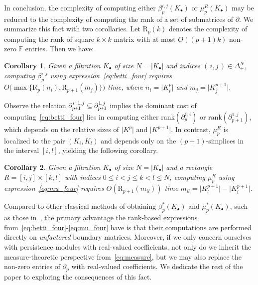 \documentclass[10pt]{article}
\numberwithin{equation}{section}
\newcommand{\+}{%
	\raisebox{0.18ex}{\scaleobj{0.55}{+}}
}
\newtheorem{corollary}{Corollary}
\theoremstyle{definition}
\begin{document}
\noindent In conclusion, the complexity of computing either $\beta_p^{i,j}(K_\bullet)$ or $\mu_p^{R}(K_\bullet)$ may be reduced to the complexity of computing the rank of a set of submatrices of $\partial$. We summarize this fact with two corollaries. Let $\mathrm{R}_p(k)$ denotes the complexity of computing the rank of square $k \times k$ matrix with at most $O((p+1)k)$ non-zero $\mathbb{F}$ entries. Then we have:
\begin{corollary}
	Given a filtration $K_\bullet$ of size $N = \lvert K_\bullet \rvert$ and indices $(\,i,j\,) \in \Delta_+^N$, computing $\beta_p^{i,j}$ using expression~\eqref{eq:betti_four} requires $O\big(\max \{\mathrm{R}_{p}(n_i), \mathrm{R}_{p+1}(m_j) \} \big)$ time, where $n_i = \lvert K_i^p \rvert$ and $m_j = \lvert K_j^{p+1} \rvert$.
\end{corollary} 
\noindent Observe the relation $\partial_{p\+1}^{i \+ 1, j} \subseteq \partial_{p\+1}^{1, j}$ implies the  dominant cost of computing~\eqref{eq:betti_four} lies in computing either $\mathrm{rank}(\partial_p^{1,i})$ or $\mathrm{rank}(\partial_{p+1}^{1,j})$, which depends on the relative sizes of $\lvert K^p\rvert$ and $\lvert K^{p+1}\rvert$. In contrast, $\mu_p^R$ is localized to the pair $(K_i, K_l)$ and depends only on the $(p+1)$-simplices in the interval $[i, l]$, yielding the following corollary. 
\begin{corollary}
	Given a filtration $K_\bullet$ of size $N = \lvert K_\bullet \rvert$ and a rectangle $R = [i,j] \times [k,l]$ with indices $0 \leq i < j \leq k < l \leq N$, computing $\mu_p^{R}$ using expression~\eqref{eq:mu_four} requires $O(\mathrm{R}_{p+1}(m_{il}))$ time $m_{il} = \lvert K_l^{p+1}\rvert - \lvert K_i^{p+1}\rvert$.
\end{corollary} 

\noindent Compared to other classical methods of obtaining $\beta_p^{\ast}(K_\bullet)$ and $\mu_p^\ast(K_\bullet)$, such as those in~\cite{edelsbrunner2022computational, zomorodian2004computing}, the primary advantage the rank-based expressions from~\eqref{eq:betti_four}-\eqref{eq:mu_four} have is that their computations are performed directly on \emph{unfactored} boundary matrices. 
Moreover, if we only concern ourselves with persistence modules with real-valued coefficients, not only do we inherit the measure-theoretic perspective from~\eqref{eq:measure}, but we may also replace the non-zero entries of $\partial_p$ with real-valued coefficients. 
We dedicate the rest of the paper to exploring the consequences of this fact. 
\end{document}
